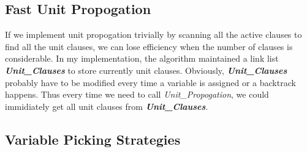\documentclass[12pt]{article}
\begin{document}
	\subsection{Fast Unit Propogation}
	If we implement unit propogation trivially by scanning all the active clauses to find all the unit clauses, we can lose efficiency when the number of clauses is considerable. In my implementation, the algorithm maintained a link list \textbf{\textit{Unit\_Clauses}} to store currently unit clauses. Obviously, \textbf{\textit{Unit\_Clauses}} probably have to be modified every time a variable is assigned or a backtrack happens. Thus every time we need to call \textit{Unit\_Propogation}, we could immidiately get all unit clauses from \textbf{\textit{Unit\_Clauses}}.
	\subsection{Variable Picking Strategies}
\end{document}
